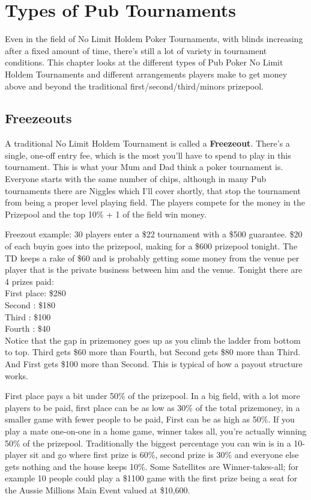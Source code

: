 \chapter{Types of Pub Tournaments}


Even in the field of No Limit Holdem Poker Tournaments,
with blinds increasing after a fixed amount of time, there's still a
lot of variety in tournament conditions. This chapter
looks at the different types of Pub Poker No Limit Holdem Tournaments
and different arrangements players make to get money above and
beyond the traditional first/second/third/minors prizepool.

\section{Freezeouts}

A traditional No Limit Holdem Tournament is called a \textbf{Freezeout}.
There's a single, one-off entry fee, which is the most you'll have to
spend to play in this tournament. This is what your Mum and Dad
think a poker tournament is. Everyone starts with the same number
of chips, although in many Pub tournaments there are Niggles which
I'll cover shortly, that stop the tournament from being a proper
level playing field. The players compete for the
money in the Prizepool and the top 10\% + 1 of the field win money.

Freezout example: 30 players enter a \$22 tournament with a \$500
guarantee. \$20 of each buyin goes into the prizepool, making for a \$600
prizepool tonight. The TD keeps a rake of \$60 and is probably getting
some money from the venue per player that is the private business
between him and the venue. Tonight
there are 4 prizes paid: \\
First place: \$280 \\
Second     : \$180 \\
Third      : \$100 \\
Fourth     :  \$40  \\


Notice that the gap in prizemoney goes up as you climb the ladder
from bottom to top. Third gets \$60 more than Fourth, but Second gets
\$80 more than Third. And First gets \$100 more than Second. This is
typical of how a payout structure works.

First place pays a bit under 50\% of the prizepool. In a
big field, with a lot more players to be paid, first place can
be as low as 30\% of the total prizemoney, in a smaller game with
fewer people to be paid, First can be as high as 50\%. If you
play a mate one-on-one in a home game, winner takes all, you're
actually winning 50\% of the prizepool. Traditionally the biggest
percentage you can win is in a 10-player sit and go where first prize
is 60\%, second prize is 30\% and everyone else gets nothing and
the house keeps 10\%. Some Satellites are Winner-takes-all; for
example 10 people could play a \$1100 game with the first prize
being a seat for the Aussie Millions Main Event valued at \$10,600.

